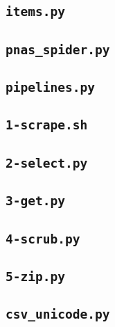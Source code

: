 \subsection{\texttt{items.py}}
\label{sec:items.py}


\subsection{\texttt{pnas\_spider.py}}
\label{sec:pnas-spider.py}


\subsection{\texttt{pipelines.py}}
\label{sec:pipeline.py}


\subsection{\texttt{1-scrape.sh}}
\label{sec:1-scrape.sh}


\subsection{\texttt{2-select.py}}
\label{sec:2-select.py}


\subsection{\texttt{3-get.py}}
\label{sec:3-get.py}


\subsection{\texttt{4-scrub.py}}
\label{sec:4-scrub.py}


\subsection{\texttt{5-zip.py}}
\label{sec:5-zip.py}


\subsection{\texttt{csv\_unicode.py}}
\label{sec:csv_unicode.py}


